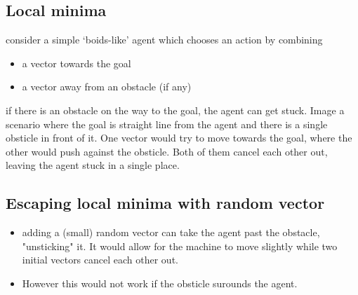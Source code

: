 \documentclass{article}
\begin{document}
\subsection{Local minima}
\begin{flushleft}
consider a simple ‘boids-like’ agent which chooses an action by combining 
\begin{itemize}
  \item a vector towards the goal 
  \item a vector away from an obstacle (if any)
\end{itemize}
if there is an obstacle on the way to the goal, the agent can get stuck. Image a scenario where the goal is straight line from the agent and there is a single obsticle in front of it. One vector would try to move towards the goal, where the other would push against the obsticle. Both of them cancel each other out, leaving the agent stuck in a single place.
\end{flushleft}

\subsection{Escaping local minima with random vector}
\begin{itemize}
  \item adding a (small) random vector can take the agent past the obstacle, "unsticking" it. It would allow for the machine to move slightly while two initial vectors cancel each other out.
  \item However this would not work if the obsticle surounds the agent.
\end{itemize}
\end{document}
